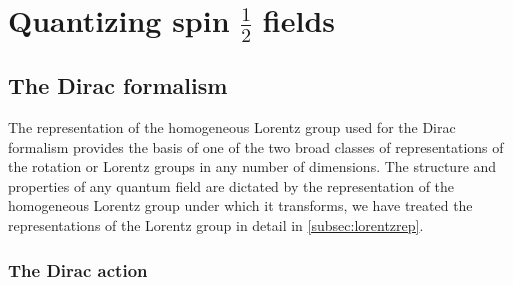 \section{Quantizing spin $\frac{1}{2}$ fields}
\subsection{The Dirac formalism}
The representation of the homogeneous Lorentz group used for the Dirac formalism provides the basis of one of the two broad classes of representations of the rotation or Lorentz groups in any number of dimensions. The structure and properties of any quantum field are dictated by the representation of the homogeneous Lorentz group under which it transforms, we have treated the representations of the Lorentz group in detail in \ref{subsec:lorentzrep}.





\subsubsection{The Dirac action}

